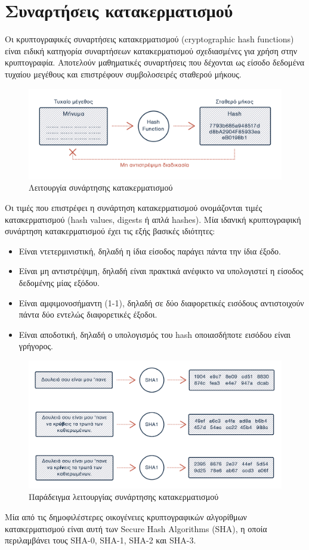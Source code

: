 \section{Συναρτήσεις κατακερματισμού} \label{section:2-1-hash-functions}

Οι κρυπτογραφικές συναρτήσεις κατακερματισμού (cryptographic hash functions) είναι ειδική κατηγορία συναρτήσεων κατακερματισμού σχεδιασμένες για χρήση στην κρυπτογραφία. Αποτελούν μαθηματικές συναρτήσεις που δέχονται ως είσοδο δεδομένα τυχαίου μεγέθους και επιστρέφουν συμβολοσειρές σταθερού μήκους.

\begin{figure}[H]
	\centering
	\includegraphics[width=.9\textwidth]{assets/figures/chapter-2/2.1.hash-functions-1}
	\caption{Λειτουργία συνάρτησης κατακερματισμού}
\end{figure}

Οι τιμές που επιστρέφει η συνάρτηση κατακερματισμού ονομάζονται τιμές κατακερματισμού (hash values, digests ή απλά hashes). Μία ιδανική κρυπτογραφική συνάρτηση κατακερματισμού έχει τις εξής βασικές ιδιότητες:

\begin{itemize}
	\item Είναι ντετερμινιστική, δηλαδή η ίδια είσοδος παράγει πάντα την ίδια έξοδο.
	\item Είναι μη αντιστρέψιμη, δηλαδή είναι πρακτικά ανέφικτο να υπολογιστεί η είσοδος δεδομένης μίας εξόδου.
	\item Είναι αμφιμονοσήμαντη (1-1), δηλαδή σε δύο διαφορετικές εισόδους αντιστοιχούν πάντα δύο εντελώς διαφορετικές έξοδοι.
	\item Είναι αποδοτική, δηλαδή ο υπολογισμός του hash οποιασδήποτε εισόδου είναι γρήγορος.
\end{itemize}

\begin{figure}[H]
	\centering
	\includegraphics[width=.9\textwidth]{assets/figures/chapter-2/2.1.hash-functions-2}
	\caption{Παράδειγμα λειτουργίας συνάρτησης κατακερματισμού}
\end{figure}

Μία από τις δημοφιλέστερες οικογένειες κρυπτογραφικών αλγορίθμων κατακερματισμού είναι αυτή των Secure Hash Algorithms (SHA), η οποία περιλαμβάνει τους SHA-0, SHA-1, SHA-2 και SHA-3.